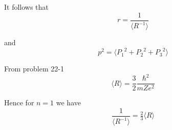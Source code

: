 It follows that
\begin{equation*}
r=\frac{1}{\langle R^{-1}\rangle}
\end{equation*}

and
\begin{equation*}
p^2=\langle{P_1}^2+{P_2}^2+{P_3}^2\rangle
\end{equation*}

From problem 22-1
\begin{equation*}
\langle R\rangle=\frac{3}{2}\frac{\hbar^2}{mZe^2}
\end{equation*}

Hence for $n=1$ we have
\begin{equation*}
\frac{1}{\langle R^{-1}\rangle}=\tfrac{2}{3}\langle R\rangle
\end{equation*}


